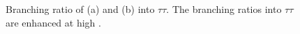 \begin{figure}[h!]
\begin{center}
\end{center}
\caption{Branching ratio of (a) \PHiggs and (b) \PHiggsps into $\tau\tau$. The branching
ratios into $\tau\tau$ are enhanced at high \tanb.}
\label{fig:mhmodp_br}
\end{figure}


